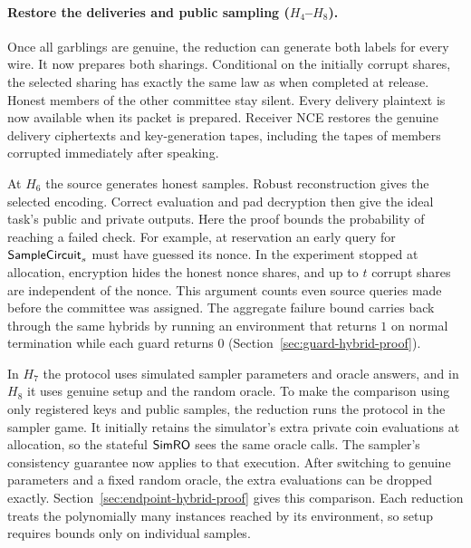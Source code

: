 \paragraph{Restore the deliveries and public sampling ($H_4$--$H_8$).}
Once all garblings are genuine, the reduction can generate both labels
for every wire.  It now prepares both sharings.  Conditional on the initially corrupt
shares, the selected sharing has exactly the same law as when completed
at release.  Honest members of the other committee stay silent.  Every delivery plaintext is now available
when its packet is prepared.  Receiver NCE restores the genuine
delivery ciphertexts and key-generation tapes, including the tapes
of members corrupted immediately after speaking.

At $H_6$ the source generates honest samples.  Robust reconstruction gives the selected encoding.  Correct evaluation
and pad decryption then give the ideal task's public and private outputs.
Here the proof bounds the probability of reaching a failed check.  For example, at reservation an
early query for $\mathsf{SampleCircuit}_s$ must have guessed its nonce.
In the experiment stopped at allocation, encryption hides the honest
nonce shares, and up to $t$ corrupt shares are independent of the nonce.
This argument counts even source queries made before the committee was
assigned.  The aggregate failure bound carries back through the same
hybrids by running an environment that returns $1$ on normal
termination while each guard returns $0$ (Section~\ref{sec:guard-hybrid-proof}).

In $H_7$ the protocol uses simulated sampler parameters and oracle
answers, and in $H_8$ it uses genuine setup and the random oracle.
To make the comparison using only registered keys and public samples,
the reduction runs the protocol in the sampler game.  It initially
retains the simulator's extra private coin evaluations at allocation,
so the stateful $\mathsf{SimRO}$ sees the same oracle calls.  The sampler's
consistency guarantee now applies to that execution.  After switching
to genuine parameters and a fixed random oracle, the extra evaluations
can be dropped exactly.  Section~\ref{sec:endpoint-hybrid-proof}
gives this comparison.  Each reduction treats the polynomially many
instances reached by its environment, so setup requires bounds only
on individual samples.
